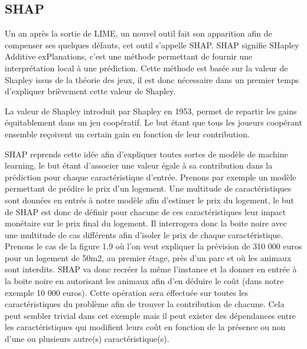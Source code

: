 \subsection{SHAP}
Un an après la sortie de LIME, un nouvel outil fait son apparition afin de compenser ses quelques défauts, cet outil s'appelle SHAP. SHAP signifie SHapley Additive exPlanations, c'est une méthode permettant de fournir une interprétation local à une prédiction. Cette méthode est basée sur la valeur de Shapley issus de la théorie des jeux, il est donc nécessaire dans un premier temps d'expliquer brièvement cette valeur de Shapley.\par
La valeur de Shapley introduit par Shapley en 1953, permet de repartir les gains équitablement dans un jeu coopératif. Le but étant que tous les joueurs coopérant ensemble reçoivent un certain gain en fonction de leur contribution.\par
SHAP reprends cette idée afin d'expliquer toutes sortes de modèle de machine learning, le but étant d'associer une valeur égale à sa contribution dans la prédiction pour chaque caractéristique d'entrée. Prenons par exemple un modèle permettant de prédire le prix d'un logement. Une multitude de caractéristiques sont données en entrés à notre modèle afin d'estimer le prix du logement, le but de SHAP est donc de définir pour chacune de ces caractéristiques leur impact monétaire sur le prix final du logement. Il interrogera donc la boite noire avec une multitude de cas différents afin d'isoler le prix de chaque caractéristique. Prenons le cas de la figure 1.9 où l'on veut expliquer la prévision de 310 000 euros pour un logement de 50m2, au premier étage, près d'un parc et où les animaux sont interdits. SHAP va donc recréer la même l'instance et la donner en entrée à la boite noire en autorisant les animaux afin d'en déduire le coût (dans notre exemple 10 000 euros). Cette opération sera effectuée sur toutes les caractéristiques du problème afin de trouver la contribution de chacune. Cela peut sembler trivial dans cet exemple mais il peut exister des dépendances entre les caractéristiques qui modifient leurs coût en fonction de la présence ou non d'une ou plusieurs autre(s) caractéristique(s).
